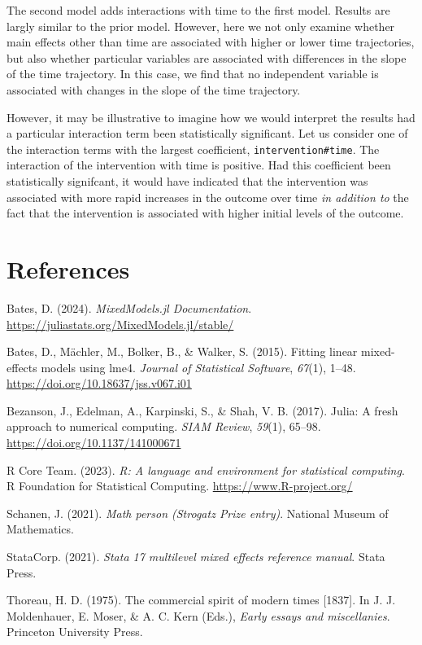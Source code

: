 \documentclass[
  letterpaper,
  DIV=11,
  numbers=noendperiod]{scrreprt}
\newlength{\cslhangindent}
\newenvironment{CSLReferences}[2] %
 {\begin{list}{}{%
  \setlength{\itemindent}{0pt}
  \setlength{\leftmargin}{0pt}
  \setlength{\parsep}{0pt}
  \ifodd #1
   \setlength{\leftmargin}{\cslhangindent}
   \setlength{\itemindent}{-1\cslhangindent}
  \fi
  \setlength{\itemsep}{#2\baselineskip}}}
 {\end{list}}
\begin{document}
The second model adds interactions with time to the first model. Results
are largly similar to the prior model. However, here we not only examine
whether main effects other than time are associated with higher or lower
time trajectories, but also whether particular variables are associated
with differences in the slope of the time trajectory. In this case, we
find that no independent variable is associated with changes in the
slope of the time trajectory.

However, it may be illustrative to imagine how we would interpret the
results had a particular interaction term been statistically
significant. Let us consider one of the interaction terms with the
largest coefficient, \texttt{intervention\#time}. The interaction of the
intervention with time is positive. Had this coefficient been
statistically signifcant, it would have indicated that the intervention
was associated with more rapid increases in the outcome over time
\emph{in addition to} the fact that the intervention is associated with
higher initial levels of the outcome.


\chapter*{References}\label{references}


\label{refs}
\begin{CSLReferences}{1}{0}
Bates, D. (2024). \emph{{MixedModels.jl Documentation}}.
\url{https://juliastats.org/MixedModels.jl/stable/}

Bates, D., Mächler, M., Bolker, B., \& Walker, S. (2015). Fitting linear
mixed-effects models using lme4. \emph{Journal of Statistical Software},
\emph{67}(1), 1--48. \url{https://doi.org/10.18637/jss.v067.i01}

Bezanson, J., Edelman, A., Karpinski, S., \& Shah, V. B. (2017). Julia:
A fresh approach to numerical computing. \emph{SIAM Review},
\emph{59}(1), 65--98. \url{https://doi.org/10.1137/141000671}

R Core Team. (2023). \emph{R: A language and environment for statistical
computing}. R Foundation for Statistical Computing.
\url{https://www.R-project.org/}

Schanen, J. (2021). \emph{Math person ({Strogatz Prize} entry)}.
National Museum of Mathematics.

StataCorp. (2021). \emph{Stata 17 multilevel mixed effects reference
manual}. Stata Press.

Thoreau, H. D. (1975). The commercial spirit of modern times {[}1837{]}.
In J. J. Moldenhauer, E. Moser, \& A. C. Kern (Eds.), \emph{Early essays
and miscellanies}. Princeton University Press.

\end{CSLReferences}
\end{document}
